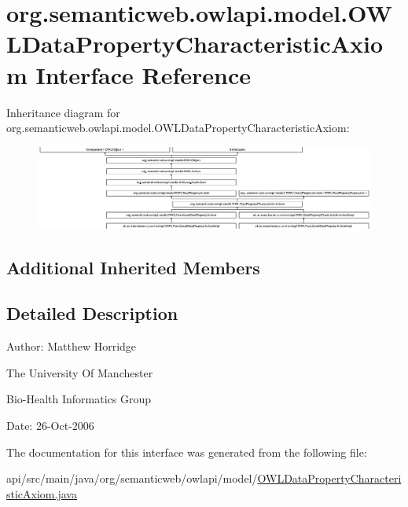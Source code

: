 \hypertarget{interfaceorg_1_1semanticweb_1_1owlapi_1_1model_1_1_o_w_l_data_property_characteristic_axiom}{\section{org.\-semanticweb.\-owlapi.\-model.\-O\-W\-L\-Data\-Property\-Characteristic\-Axiom Interface Reference}
\label{interfaceorg_1_1semanticweb_1_1owlapi_1_1model_1_1_o_w_l_data_property_characteristic_axiom}
}
Inheritance diagram for org.\-semanticweb.\-owlapi.\-model.\-O\-W\-L\-Data\-Property\-Characteristic\-Axiom\-:\begin{figure}[H]
\begin{center}
\leavevmode
\includegraphics[height=2.775713cm]{interfaceorg_1_1semanticweb_1_1owlapi_1_1model_1_1_o_w_l_data_property_characteristic_axiom}
\end{center}
\end{figure}
\subsection*{Additional Inherited Members}


\subsection{Detailed Description}
Author\-: Matthew Horridge\par
 The University Of Manchester\par
 Bio-\/\-Health Informatics Group\par
 Date\-: 26-\/\-Oct-\/2006\par
\par
 

The documentation for this interface was generated from the following file\-:\begin{DoxyCompactItemize}
\item 
api/src/main/java/org/semanticweb/owlapi/model/\hyperlink{_o_w_l_data_property_characteristic_axiom_8java}{O\-W\-L\-Data\-Property\-Characteristic\-Axiom.\-java}\end{DoxyCompactItemize}
